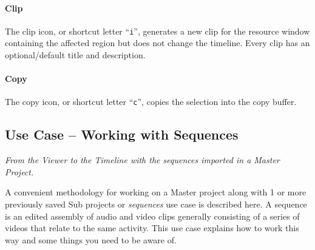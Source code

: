 \paragraph{Clip} The clip icon, or shortcut letter “\texttt{i}”, generates a new clip for the resource window containing the affected region but does not change the timeline.  Every clip has an optional/default title and description.

\paragraph{Copy} The copy icon, or shortcut letter “\texttt{c}”, copies the selection into the copy buffer.

\subsection{Use Case – Working with Sequences}
\label{sub:use_case_working_sequences}

\textit{From the Viewer to the Timeline with the sequences imported 
in a Master Project.}

A convenient methodology for working on a Master project along with 1 or more previously saved Sub projects or \textit{sequences} use case is described here.  A sequence is an edited assembly of audio and video clips generally consisting of a series of videos that relate to the same activity. This use case explains how to work this way and some things you need to be aware of.

